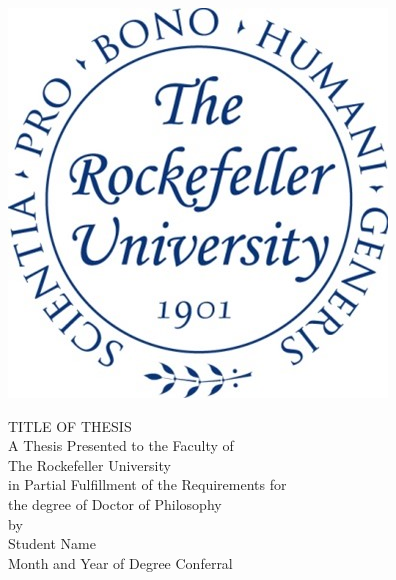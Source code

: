   
\begin{titlepage}
\begin{center}

\begin{singlespacing}
\vspace*{2\baselineskip}
\includegraphics[width = 1.73 in]{figures/Rockefeller_Seal.jpg}\\
\vspace*{5\baselineskip}

TITLE OF THESIS\\ %

\vspace{8\baselineskip}
A Thesis Presented to the Faculty of\\
The Rockefeller University\\
in Partial Fulfillment of the Requirements for\\
the degree of Doctor of Philosophy\\
\vspace{8\baselineskip}
by\\
Student Name\\ %
Month and Year of Degree Conferral %
\vspace{3\baselineskip}
\vfill


\end{singlespacing}

\end{center}
\end{titlepage}


